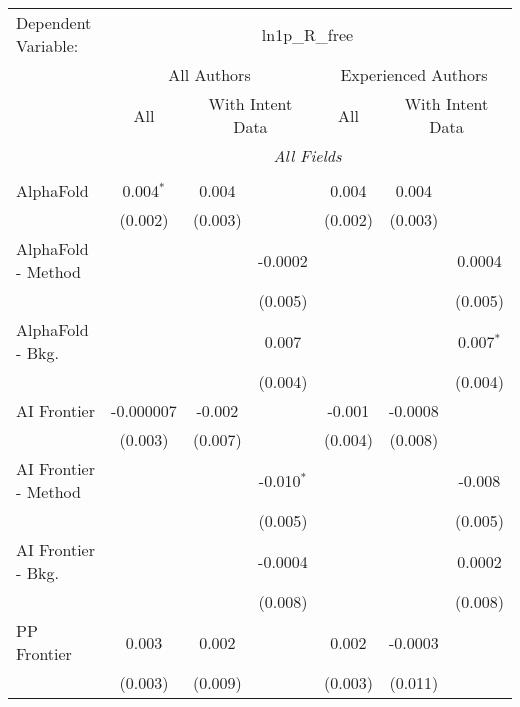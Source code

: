 \begingroup
\centering
\begin{tabular}{lcccccc}
   \tabularnewline \midrule \midrule
   Dependent Variable: & \multicolumn{6}{c}{ln1p\_R\_free}\\
 & \multicolumn{3}{c}{All Authors} & \multicolumn{3}{c}{Experienced Authors} \\
\cmidrule(lr){2-4} \cmidrule(lr){5-7}
 & \multicolumn{1}{c}{All} & \multicolumn{2}{c}{With Intent Data} & \multicolumn{1}{c}{All} & \multicolumn{2}{c}{With Intent Data} \\
\cmidrule(lr){2-2} \cmidrule(lr){3-4} \cmidrule(lr){5-5} \cmidrule(lr){6-7}
 & \multicolumn{6}{c}{\textit{All Fields}} \\ \\
   AlphaFold            & 0.004$^{*}$ & 0.004   &               & 0.004   & 0.004   &   \\   
                        & (0.002)     & (0.003) &               & (0.002) & (0.003) &   \\   
   AlphaFold - Method   &             &         & -0.0002       &         &         & 0.0004\\   
                        &             &         & (0.005)       &         &         & (0.005)\\   
   AlphaFold - Bkg.     &             &         & 0.007         &         &         & 0.007$^{*}$\\   
                        &             &         & (0.004)       &         &         & (0.004)\\   
   AI Frontier          & -0.000007   & -0.002  &               & -0.001  & -0.0008 &   \\   
                        & (0.003)     & (0.007) &               & (0.004) & (0.008) &   \\   
   AI Frontier - Method &             &         & -0.010$^{*}$  &         &         & -0.008\\   
                        &             &         & (0.005)       &         &         & (0.005)\\   
   AI Frontier - Bkg.   &             &         & -0.0004       &         &         & 0.0002\\   
                        &             &         & (0.008)       &         &         & (0.008)\\   
   PP Frontier          & 0.003       & 0.002   &               & 0.002   & -0.0003 &   \\   
                        & (0.003)     & (0.009) &               & (0.003) & (0.011) &   \\   

\end{tabular}
